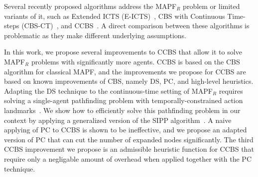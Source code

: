 \documentclass[letterpaper]{article} %
\newcommand\konstantin[1]{\nb{\textbf{Konstantin:}}{red}{#1}}
\newcommand\roni[1]{\nb{\textbf{Roni:}}{orange}{#1}}
\newcommand{\cbs}{\ac{CBS}\xspace}
\newcommand{\ccbs}{\ac{CCBS}\xspace}
\newcommand{\sipp}{\ac{SIPP}\xspace}
\newcommand{\mapfr}{{MAPF}$_R$\xspace}
\newcommand{\mapf}{\ac{MAPF}\xspace}
\newcommand{\pc}{\ac{PC}\xspace}
\newcommand{\ds}{\ac{DS}\xspace}
\begin{document}
Several recently proposed algorithms address the \mapfr problem or limited variants of it, such as Extended ICTS (E-ICTS)~\cite{walker2018extended}, CBS with Continuous Time-steps (CBS-CT)~\cite{cohen2019optimal}, and \ccbs~\cite{andreychuk2019multi}. A direct comparison between these algorithms is problematic as they make different underlying assumptions.


In this work, we propose several improvements to \ccbs that allow it to solve \mapfr problems with significantly more agents. %
\ccbs is based on the \cbs algorithm for classical \mapf, and the improvements we propose for \ccbs are based on known improvements of \cbs, namely \ds, \pc, and high-level heuristics.
Adapting the \ds technique to the continuous-time setting of \mapfr requires solving a single-agent pathfinding problem with temporally-constrained action landmarks~\cite{karpas2009cost}.
We show how to efficiently solve this pathfinding problem in our context by applying a generalized version of the \sipp algorithm~\cite{phillips2011sipp}.
A naive applying of \pc to \ccbs is shown to be ineffective, and we propose an adapted version of \pc that can cut the number of expanded nodes significantly.
The third \ccbs improvement we propose is an admissible heuristic function for \ccbs that require only a negligable amount of overhead when applied together with the \pc technique.
\end{document}
